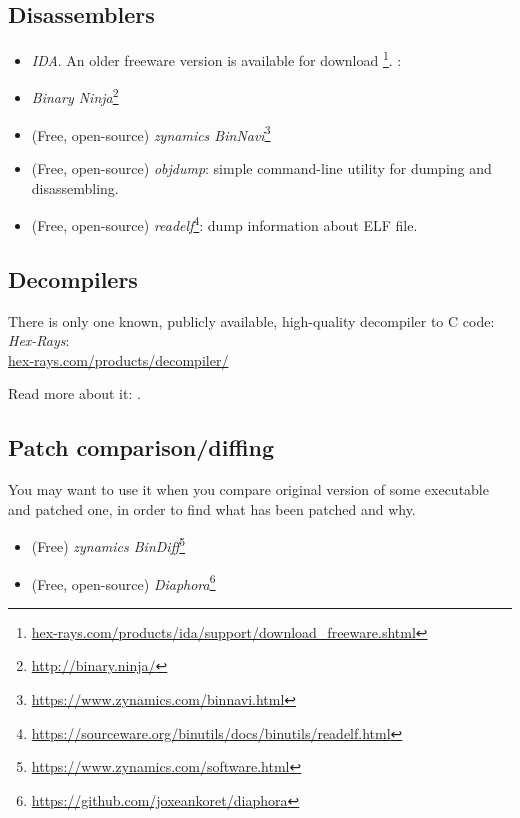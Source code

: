 \subsection{Disassemblers}


\begin{itemize}
\item \emph{IDA}. An older freeware version is available for download
\footnote{\href{http://go.yurichev.com/17031}{hex-rays.com/products/ida/support/download\_freeware.shtml}}.
\ShortHotKeyCheatsheet: 

\item \emph{Binary Ninja}\footnote{\url{http://binary.ninja/}}

\item (Free, open-source) \emph{zynamics BinNavi}\footnote{\url{https://www.zynamics.com/binnavi.html}}

\item (Free, open-source) \emph{objdump}: simple command-line utility for dumping and disassembling.

\item (Free, open-source) \emph{readelf}\footnote{\url{https://sourceware.org/binutils/docs/binutils/readelf.html}}:
dump information about ELF file.
\end{itemize}

\subsection{Decompilers}

There is only one known, publicly available, high-quality decompiler to C code: \emph{Hex-Rays}:\\
\href{http://go.yurichev.com/17033}{hex-rays.com/products/decompiler/}

Read more about it: .

\subsection{Patch comparison/diffing}

You may want to use it when you compare original version of some executable and patched one, in order to find
what has been patched and why.

\begin{itemize}
\item (Free) \emph{zynamics BinDiff}\footnote{\url{https://www.zynamics.com/software.html}}

\item (Free, open-source) \emph{Diaphora}\footnote{\url{https://github.com/joxeankoret/diaphora}}
\end{itemize}

